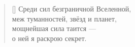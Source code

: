 \documentclass[a5paper,11pt]{memoir}
\begin{document}
\newpage
\hfill

\BgThispage


\newpage
\PlainPoemTitle
{}
\vspace{2cm}
\begin{verse}[\versewidth]
\hspace{1.5cm}Среди сил безграничной Вселенной, \\
\hspace{1.4cm}меж туманностей, звёзд и планет, \\
\hspace{1.3cm}мощнейшая сила таится --- \\ 
\hspace{1.2cm}о ней я раскрою секрет.
\end{verse}
\end{document}
